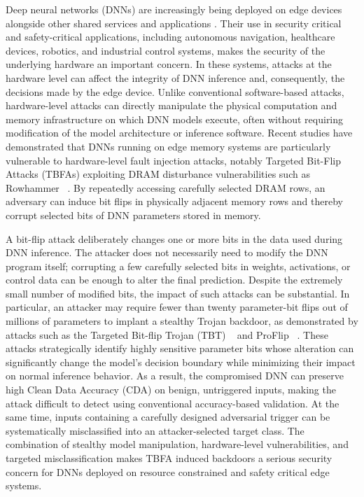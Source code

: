 \documentclass[conference,10pt]{IEEEtran}
\begin{document}
Deep neural networks (DNNs) are increasingly being deployed on edge devices alongside other shared services and applications \cite{zhou2022deep}. Their use in security critical and safety-critical applications, including autonomous navigation, healthcare devices, robotics, and industrial control systems, makes the security of the underlying hardware an important concern. In these systems, attacks at the hardware level can affect the integrity of DNN inference and, consequently, the decisions made by the edge device. Unlike conventional software-based attacks, hardware-level attacks can directly manipulate the physical computation and memory infrastructure on which DNN models execute, often without requiring modification of the model architecture or inference software. Recent studies have demonstrated that DNNs running on edge memory systems are particularly vulnerable to hardware-level fault injection attacks, notably Targeted Bit-Flip Attacks (TBFAs) exploiting DRAM disturbance vulnerabilities such as Rowhammer ~\cite{kim2014rowhammer}. By repeatedly accessing carefully selected DRAM rows, an adversary can induce bit flips in physically adjacent memory rows and thereby corrupt selected bits of DNN parameters stored in memory.

A bit-flip attack deliberately changes one or more bits in the data used during DNN inference. The attacker does not necessarily need to modify the DNN program itself; corrupting a few carefully selected bits in weights, activations, or control data can be enough to alter the final prediction. Despite the extremely small number of modified bits, the impact of such attacks can be substantial. In particular, an attacker may require fewer than twenty parameter-bit flips out of millions of parameters to implant a stealthy Trojan backdoor, as demonstrated by attacks such as the Targeted Bit-flip Trojan (TBT) ~\cite{rakin2020tbt} and ProFlip ~\cite{chen2021proflip}. These attacks strategically identify highly sensitive parameter bits whose alteration can significantly change the model's decision boundary while minimizing their impact on normal inference behavior. As a result, the compromised DNN can preserve high Clean Data Accuracy (CDA) on benign, untriggered inputs, making the attack difficult to detect using conventional accuracy-based validation. At the same time, inputs containing a carefully designed adversarial trigger can be systematically misclassified into an attacker-selected target class. The combination of stealthy model manipulation, hardware-level vulnerabilities, and targeted misclassification makes TBFA induced backdoors a serious security concern for DNNs deployed on resource constrained and safety critical edge systems.
\end{document}
